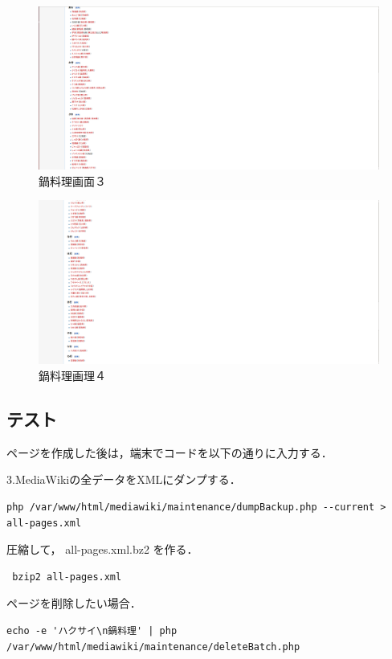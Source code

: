 \begin{figure}[!htb]
\centering
\includegraphics[width=18cm]{nabe3}
\caption{鍋料理画面３}\label{nabe3}
\end{figure}

\begin{figure}[!htb]
\centering
\includegraphics[width=18cm]{nabe4}
\caption{鍋料理画理４}\label{nabe4}
\end{figure}
\clearpage

\subsection{テスト}
ページを作成した後は，端末でコードを以下の通りに入力する．

3.MediaWikiの全データをXMLにダンプする．
{\small
\begin{verbatim}
php /var/www/html/mediawiki/maintenance/dumpBackup.php --current > all-pages.xml
\end{verbatim}}

圧縮して， all-pages.xml.bz2 を作る．
{\small
\begin{verbatim}
 bzip2 all-pages.xml 
\end{verbatim}}


ページを削除したい場合．
{\small
\begin{verbatim}
echo -e 'ハクサイ\n鍋料理' | php /var/www/html/mediawiki/maintenance/deleteBatch.php
\end{verbatim}}

